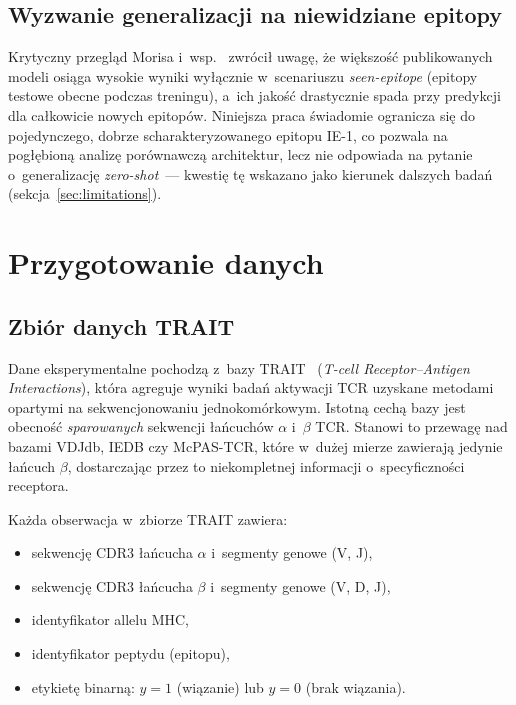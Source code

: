 \documentclass{SGGW-thesis}
\begin{document}
\section{Wyzwanie generalizacji na niewidziane epitopy}

Krytyczny przegląd Morisa i~wsp.~\cite{moris2021} zwrócił uwagę, że większość publikowanych modeli
osiąga wysokie wyniki wyłącznie w~scenariuszu \textit{seen-epitope} (epitopy testowe obecne podczas
treningu), a~ich jakość drastycznie spada przy predykcji dla całkowicie nowych epitopów. Niniejsza
praca świadomie ogranicza się do pojedynczego, dobrze scharakteryzowanego epitopu IE-1, co pozwala
na pogłębioną analizę porównawczą architektur, lecz nie odpowiada na pytanie o~generalizację
\textit{zero-shot}~--- kwestię tę wskazano jako kierunek dalszych badań (sekcja~\ref{sec:limitations}).

\chapter{Przygotowanie danych}
\label{chap:dane}

\section{Zbiór danych TRAIT}

Dane eksperymentalne pochodzą z~bazy TRAIT~\cite{trait} (\textit{T-cell Receptor--Antigen Interactions}),
która agreguje wyniki badań aktywacji TCR uzyskane metodami opartymi
na sekwencjonowaniu jednokomórkowym. Istotną cechą bazy jest obecność \textit{sparowanych} sekwencji
łańcuchów $\alpha$ i~$\beta$ TCR. Stanowi to przewagę nad bazami VDJdb, IEDB czy McPAS-TCR,
które w~dużej mierze zawierają jedynie łańcuch $\beta$, dostarczając przez to niekompletnej
informacji o~specyficzności receptora.

Każda obserwacja w~zbiorze TRAIT zawiera:
\begin{itemize}
  \item sekwencję CDR3 łańcucha $\alpha$ i~segmenty genowe (V, J),
  \item sekwencję CDR3 łańcucha $\beta$ i~segmenty genowe (V, D, J),
  \item identyfikator allelu MHC,
  \item identyfikator peptydu (epitopu),
  \item etykietę binarną: $y = 1$ (wiązanie) lub $y = 0$ (brak wiązania).
\end{itemize}
\end{document}
